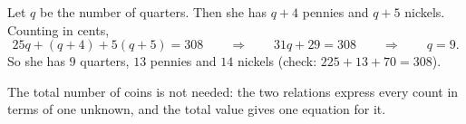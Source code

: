 Let $q$ be the number of quarters. Then she has $q+4$ pennies and $q+5$ nickels. Counting in cents,
\[
25q+(q+4)+5(q+5)=308\qquad\Longrightarrow\qquad 31q+29=308\qquad\Longrightarrow\qquad q=9 .
\]
So she has $9$ quarters, $13$ pennies and $\boxed{14}$ nickels (check: $225+13+70=308$).

The total number of coins is not needed: the two relations express every count in terms of one unknown, and the total value gives one equation for it.
